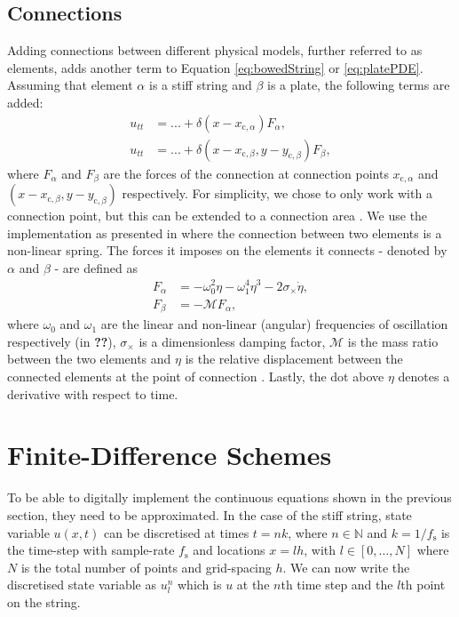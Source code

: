 \documentclass{article}
\begin{document}
\subsection{Connections}\label{sec:connections}
Adding connections between different physical models, further referred to as elements, adds another term to Equation \eqref{eq:bowedString} or \eqref{eq:platePDE}. Assuming that element $\alpha$ is a stiff string and $\beta$ is a plate, the following terms are added:
\begin{subequations}
\begin{align}
    \label{eq:stringConnection}
    u_{tt} &= ... + \delta(x-x_{\text{c},\alpha})F_\alpha, \\
    \label{eq:plateConnection}
    u_{tt} &= ... + \delta(x-x_{\text{c},\beta}, y-y_{\text{c},\beta})F_\beta,
\end{align}
\end{subequations}
where $F_\alpha$ and $F_\beta$ are the forces of the connection at connection points $x_{\text{c},\alpha}$ and $(x-x_{\text{c},\beta}, y-y_{\text{c},\beta})$ respectively. For simplicity, we chose to only work with a connection point, but this can be extended to a connection area \cite{Bilbao2009:ModularPercussion}. We use the implementation as presented in \cite{Bilbao2009:ModularPercussion} where the connection between two elements is a non-linear spring. The forces it imposes on the elements it connects - denoted by $\alpha$ and $\beta$ - are defined as
\begin{subequations}\label{eq:connectionsPDE}
\begin{align}
    F_\alpha &= -\omega_0^2\eta - \omega_1^4\eta^3 - 2\sigma_\times\dot\eta,\\
    \label{eq:FBeta} F_\beta &= -\mathcal{M}F_\alpha,
\end{align}
\end{subequations}
where $\omega_0$ and $\omega_1$ are the linear and non-linear (angular) frequencies of oscillation respectively (in \textbf{??}), $\sigma_\times$ is a dimensionless damping factor, $\mathcal{M}$ is the mass ratio between the two elements and $\eta$ is the relative displacement between the connected elements at the point of connection%
. Lastly, the dot above $\eta$ denotes a derivative with respect to time.

\section{Finite-Difference Schemes}\label{sec:FDS}
To be able to digitally implement the continuous equations shown in the previous section, they need to be approximated. In the case of the stiff string, state variable $u(x,t)$ can be discretised at times $t = nk$, where $n \in \mathbb{N}$ and $k = 1 / f_\text{s}$ is the time-step with sample-rate $f_\text{s}$ and locations $x = lh$, with $l \in [0,\hdots, N]$ where $N$ is the total number of points and grid-spacing $h$. We can now write the discretised state variable as $u_l^n$ which is $u$ at the $n$th time step and the $l$th point on the string.
\end{document}
